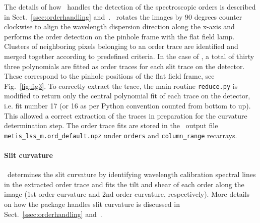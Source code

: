 The details of how \pyred~handles the detection of the spectroscopic orders is described in Sect.~\ref{ssec:orderhandling} and~\cite{pis02, pis21}. 
\pyred~rotates the images by 90 degrees counter clockwise to align the wavelength dispersion direction along the x-axis and performs the order detection on the pinhole frame with the flat field lamp.  Clusters of neighboring pixels belonging to an order trace are identified  and merged together according to predefined criteria. In the case of \met, a total of thirty three polynomials are fitted as order traces for each slit trace on the detector. These correspond to the pinhole positions of the flat field frame, see Fig.~\ref{fig:fig3}. To correctly extract the trace, the main routine \texttt{reduce.py} is modified to return only the central polynomial fit of each trace on the detector, i.e. fit number 17 (or 16 as per Python convention counted from bottom to up). This allowed a correct extraction of the traces in preparation for the curvature determination step. The order trace fits are stored in the \pyred~output file \texttt{metis\_lss\_m.ord\_default.npz} under \texttt{orders} and \texttt{column\_range} recarrays.
\paragraph{Slit curvature}\label{sec:critalg_orderrect}


\pyred~determines the slit curvature by identifying wavelength calibration spectral lines in the extracted order trace and fits the tilt and shear of each order along the image (1st order curvature and 2nd order curvature, respectively). More details on how the package handles slit curvature is discussed in Sect.~\ref{ssec:orderhandling} and~\cite{pis21}. 

